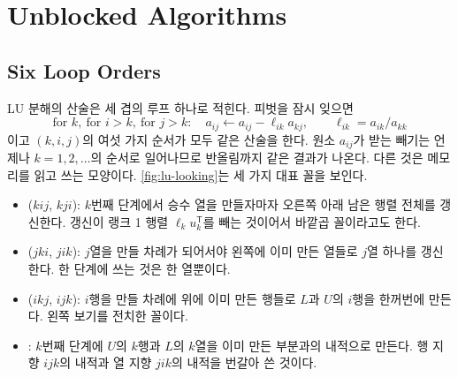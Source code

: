 \section{Unblocked Algorithms}
\label{sec:lu-unblocked}

\subsection{Six Loop Orders}

LU 분해의 산술은 세 겹의 루프 하나로 적힌다. 피벗을 잠시 잊으면
\[
\text{for } k,\ \text{for } i>k,\ \text{for } j>k:\quad a_{ij}\gets a_{ij}-\ell_{ik}a_{kj},\qquad \ell_{ik}=a_{ik}/a_{kk}
\]
이고 $(k,i,j)$의 여섯 가지 순서가 모두 같은 산술을 한다. 원소 $a_{ij}$가 받는 빼기는 언제나 $k=1,2,\dots$의 순서로 일어나므로 반올림까지 같은 결과가 나온다. 다른 것은 메모리를 읽고 쓰는 모양이다. \cref{fig:lu-looking}는 세 가지 대표 꼴을 보인다.
\begin{itemize}
\item {}($kij$, $kji$): $k$번째 단계에서 승수 열을 만들자마자 오른쪽 아래 남은 행렬 전체를 갱신한다. 갱신이 랭크 1 행렬 $\ell_ku_k^{\mathsf T}$를 빼는 것이어서 바깥곱 꼴이라고도 한다.
\item {}($jki$, $jik$): $j$열을 만들 차례가 되어서야 왼쪽에 이미 만든 열들로 $j$열 하나를 갱신한다. 한 단계에 쓰는 것은 한 열뿐이다.
\item {}($ikj$, $ijk$): $i$행을 만들 차례에 위에 이미 만든 행들로 $L$과 $U$의 $i$행을 한꺼번에 만든다. 왼쪽 보기를 전치한 꼴이다.
\item {}: $k$번째 단계에 $U$의 $k$행과 $L$의 $k$열을 이미 만든 부분과의 내적으로 만든다. 행 지향 $ijk$의 내적과 열 지향 $jik$의 내적을 번갈아 쓴 것이다.
\end{itemize}

